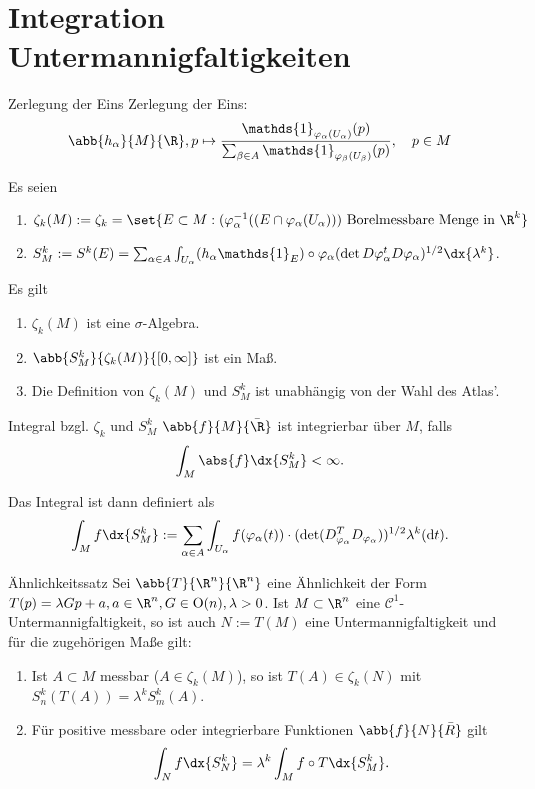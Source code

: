 \section*{Integration Untermannigfaltigkeiten}

\begin{karte}{Zerlegung der Eins}
    Zerlegung der Eins: 
    \[ \abb{h_\alpha}{M}{\R}, p \mapsto \frac{\mathds{1}_{\varphi_\alpha(U_\alpha)}(p) }{ \sum_{\beta \in A} \mathds{1}_{ \varphi_\beta (U_\beta) }(p) }, \quad p\in M \]

    Es seien 
    \begin{enumerate}
        \item \( \zeta_k(M) := \zeta_k = \set{ E \subset M: (\varphi_\alpha^{-1}((E\cap \varphi_\alpha(U_\alpha))) \text{ Borelmessbare Menge in } \R^k } \)
        \item \( S_M^k := S^k(E) = \sum_{\alpha \in A} \int_{U_\alpha} (h_\alpha \mathds{1}_E) 
        \circ \varphi_\alpha(\det D \varphi_\alpha^t D \varphi_\alpha)^{1/2} \dx{\lambda^k} \).
    \end{enumerate}

    Es gilt 
    \begin{enumerate}
        \item \( \zeta_k(M) \) ist eine \(\sigma\)-Algebra.
        \item \( \abb{S_M^k}{\zeta_k(M)}{[0,\infty]} \) ist ein Maß.
        \item Die Definition von \( \zeta_k(M) \) und \( S_M^k \) ist unabhängig von der Wahl des Atlas'.
    \end{enumerate}
\end{karte}

\begin{karte}{Integral bzgl. \( \zeta_k \) und \( S_M^k \)}
    \( \abb{f}{M}{\bar{\R}} \) ist integrierbar über \(M\), falls 
    \[ \int_M \abs{f} \dx{S_M^k} < \infty. \]

    Das Integral ist dann definiert als 
    \[ \int_M f \dx{S_M^k} := \sum_{\alpha\in A} \int_{U_\alpha} f(\varphi_\alpha(t)) \cdot (\det (D^T_{\varphi_\alpha}  D_{\varphi_\alpha}))^{1/2} \lambda^k(\mathrm{d}t). \]
\end{karte}

\begin{karte}{Ähnlichkeitssatz}
    Sei \( \abb{T}{\R^n}{\R^n} \) eine Ähnlichkeit der Form 
    \( T(p) = \lambda Gp + a, a \in \R^n, G\in \mathrm{O}(n), \lambda > 0 \). Ist \(M \subset \R^n \)
    eine \(\mathcal{C}^1\)-Untermannigfaltigkeit, so ist auch \(N := T(M) \) eine Untermannigfaltigkeit 
    und für die zugehörigen Maße gilt: 
    \begin{enumerate}
        \item Ist \(A \subset M\) messbar (\(A\in \zeta_k(M)\)), so ist \(T(A) \in \zeta_k(N)\) 
        mit \( S_n^k(T(A)) = \lambda^k S_m^k(A) \).
        \item Für positive messbare oder integrierbare Funktionen \( \abb{f}{N}{\bar{R}} \) gilt 
        \[ \int_N f \dx{S_N^k} = \lambda^k \int_M f \circ T \dx{S_M^k}. \]
    \end{enumerate}
\end{karte}

